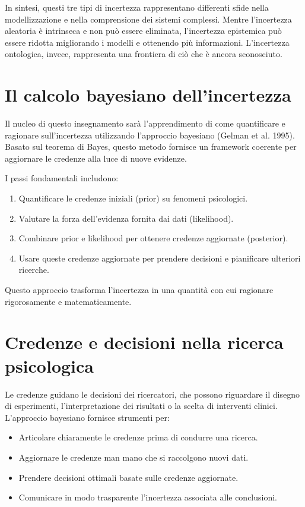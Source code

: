\documentclass[
  letterpaper,
  krantz2]{{[}./krantz{]}}
\providecommand{\tightlist}{%
  \setlength{\itemsep}{0pt}\setlength{\parskip}{0pt}}\usepackage{longtable,booktabs,array}
\begin{document}
In sintesi, questi tre tipi di incertezza rappresentano differenti sfide
nella modellizzazione e nella comprensione dei sistemi complessi. Mentre
l'incertezza aleatoria è intrinseca e non può essere eliminata,
l'incertezza epistemica può essere ridotta migliorando i modelli e
ottenendo più informazioni. L'incertezza ontologica, invece, rappresenta
una frontiera di ciò che è ancora sconosciuto.

\section{Il calcolo bayesiano
dell'incertezza}\label{il-calcolo-bayesiano-dellincertezza}

Il nucleo di questo insegnamento sarà l'apprendimento di come
quantificare e ragionare sull'incertezza utilizzando l'approccio
bayesiano (Gelman et al. 1995). Basato sul teorema di Bayes, questo
metodo fornisce un framework coerente per aggiornare le credenze alla
luce di nuove evidenze.

I passi fondamentali includono:

\begin{enumerate}
\def\labelenumi{\arabic{enumi}.}
\tightlist
\item
  Quantificare le credenze iniziali (prior) su fenomeni psicologici.
\item
  Valutare la forza dell'evidenza fornita dai dati (likelihood).
\item
  Combinare prior e likelihood per ottenere credenze aggiornate
  (posterior).
\item
  Usare queste credenze aggiornate per prendere decisioni e pianificare
  ulteriori ricerche.
\end{enumerate}

Questo approccio trasforma l'incertezza in una quantità con cui
ragionare rigorosamente e matematicamente.

\section{Credenze e decisioni nella ricerca
psicologica}\label{credenze-e-decisioni-nella-ricerca-psicologica}

Le credenze guidano le decisioni dei ricercatori, che possono riguardare
il disegno di esperimenti, l'interpretazione dei risultati o la scelta
di interventi clinici. L'approccio bayesiano fornisce strumenti per:

\begin{itemize}
\tightlist
\item
  Articolare chiaramente le credenze prima di condurre una ricerca.
\item
  Aggiornare le credenze man mano che si raccolgono nuovi dati.
\item
  Prendere decisioni ottimali basate sulle credenze aggiornate.
\item
  Comunicare in modo trasparente l'incertezza associata alle
  conclusioni.
\end{itemize}
\end{document}
